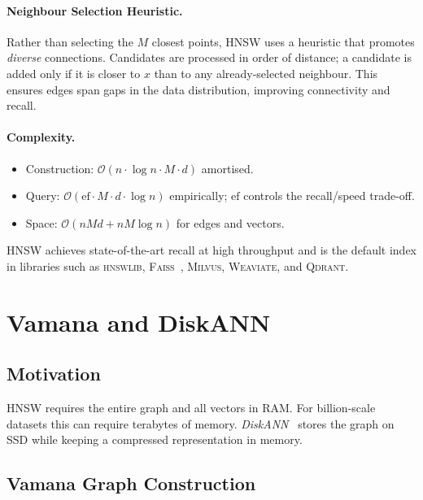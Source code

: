 \documentclass[11pt,a4paper]{article}
\theoremstyle{definition}
\newcommand{\calO}{\mathcal{O}}
\begin{document}
\paragraph{Neighbour Selection Heuristic.}
Rather than selecting the $M$ closest points, HNSW uses a heuristic
that promotes \emph{diverse} connections.  Candidates are processed in
order of distance; a candidate is added only if it is closer to $x$ than
to any already-selected neighbour.  This ensures edges span gaps in the
data distribution, improving connectivity and recall.

\paragraph{Complexity.}
\begin{itemize}[nosep]
  \item Construction: $\calO(n \cdot \log n \cdot M \cdot d)$ amortised.
  \item Query: $\calO(\mathrm{ef} \cdot M \cdot d \cdot \log n)$
    empirically; $\mathrm{ef}$ controls the recall/speed trade-off.
  \item Space: $\calO(nMd + nM\log n)$ for edges and vectors.
\end{itemize}

HNSW achieves state-of-the-art recall at high throughput and is the
default index in libraries such as \textsc{hnswlib}, \textsc{Faiss}~\cite{douze2024faiss},
\textsc{Milvus}, \textsc{Weaviate}, and \textsc{Qdrant}.


\section{Vamana and DiskANN}\label{sec:diskann}

\subsection{Motivation}

HNSW requires the entire graph and all vectors in RAM.  For billion-scale
datasets this can require terabytes of memory.  \emph{DiskANN}~\cite{jayaram2019diskann} stores the graph on SSD while keeping a
compressed representation in memory.

\subsection{Vamana Graph Construction}
\end{document}
